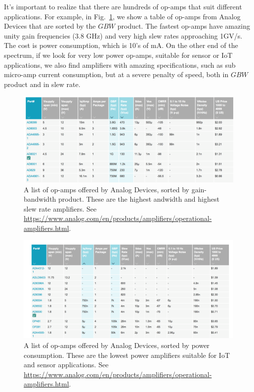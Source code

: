 It's important to realize that there are hundreds of op-amps that suit different applications.  For example, in Fig.~\ref{fig:opamp_table.png}, we show a table of op-amps from Analog Devices that are sorted by the $GBW$ product.  The fastest op-amps have amazing unity gain frequencies (3.8 GHz) and very high slew rates approaching 1GV/s.  The cost is power consumption, which is 10's of mA.  On the other end of the spectrum, if we look for very low power op-amps, suitable for sensor or IoT applications, we also find amplifiers with amazing specifications, such as sub micro-amp current consumption, but at a severe penalty of speed, both in $GBW$ product and in slew rate.  
\begin{figure}[tb]
\begin{center}
\includegraphics[width=\columnwidth]{opamp_table.png}
\end{center}
\caption{A list of op-amps offered by Analog Devices, sorted by gain-bandwidth product.  These are the highest andwidth and highest slew rate amplifiers.  See \url{https://www.analog.com/en/products/amplifiers/operational-amplifiers.html}.} \label{fig:opamp_table.png}
\end{figure}
\begin{figure}[tb]
\begin{center}
\includegraphics[width=\columnwidth]{opamp_lowpower.png}
\end{center}
\caption{A list of op-amps offered by Analog Devices, sorted by power consumption.  These are the lowest power amplifiers suitable for IoT and sensor applications.  See \url{https://www.analog.com/en/products/amplifiers/operational-amplifiers.html}.} \label{fig:opamp_lowpower.png}
\end{figure}

